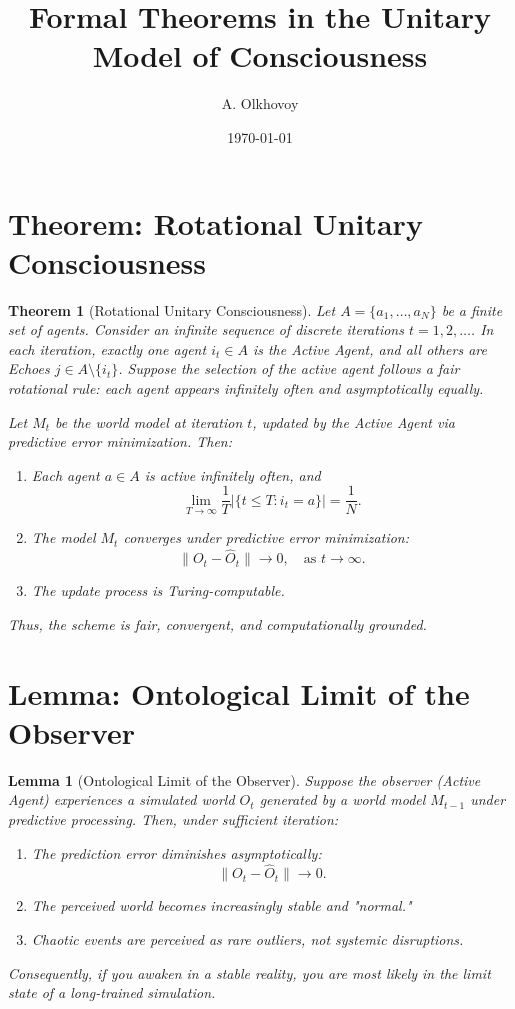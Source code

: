 \documentclass[12pt]{article}
\title{Formal Theorems in the Unitary Model of Consciousness}
\author{A. Olkhovoy}
\date{\today}
\newtheorem{theorem}{Theorem}
\newtheorem{lemma}{Lemma}
\begin{document}
\maketitle

\section*{Theorem: Rotational Unitary Consciousness}

\begin{theorem}[Rotational Unitary Consciousness]
Let $A = \{a_1, \dots, a_N\}$ be a finite set of agents. Consider an infinite sequence of discrete iterations $t = 1, 2, \dots$. In each iteration, exactly one agent $i_t \in A$ is the Active Agent, and all others are Echoes $j \in A \setminus \{i_t\}$. Suppose the selection of the active agent follows a fair rotational rule: each agent appears infinitely often and asymptotically equally.

Let $M_t$ be the world model at iteration $t$, updated by the Active Agent via predictive error minimization. Then:

\begin{enumerate}
    \item Each agent $a \in A$ is active infinitely often, and
    \[ \lim_{T \to \infty} \frac{1}{T} \left|\{ t \leq T : i_t = a \} \right| = \frac{1}{N}. \]

    \item The model $M_t$ converges under predictive error minimization:
    \[ \| O_t - \hat{O}_t \| \to 0, \quad \text{as } t \to \infty. \]

    \item The update process is Turing-computable.
\end{enumerate}

Thus, the scheme is fair, convergent, and computationally grounded.
\end{theorem}

\vspace{1em}

\section*{Lemma: Ontological Limit of the Observer}

\begin{lemma}[Ontological Limit of the Observer]
Suppose the observer (Active Agent) experiences a simulated world $O_t$ generated by a world model $M_{t-1}$ under predictive processing. Then, under sufficient iteration:
\begin{enumerate}
    \item The prediction error diminishes asymptotically:
    \[ \|O_t - \hat{O}_t\| \to 0. \]
    \item The perceived world becomes increasingly stable and "normal."
    \item Chaotic events are perceived as rare outliers, not systemic disruptions.
\end{enumerate}

Consequently, if you awaken in a stable reality, you are most likely in the limit state of a long-trained simulation.
\end{lemma}
\end{document}

